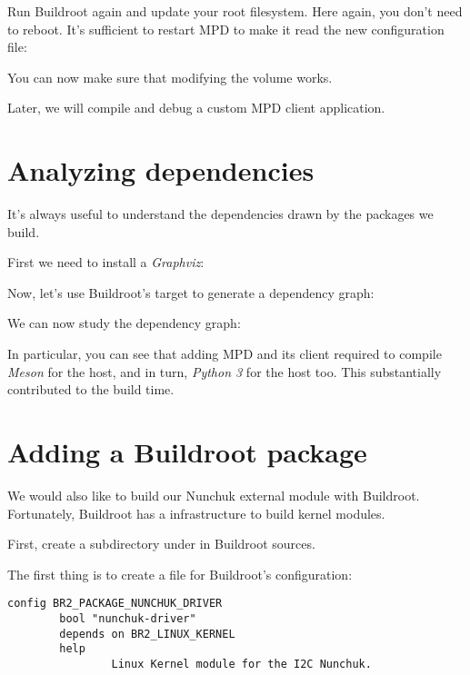 Run Buildroot again and update your root filesystem. Here again, you
don't need to reboot. It's sufficient to restart MPD to make it read
the new configuration file:


You can now make sure that modifying the volume works.

Later, we will compile and debug a custom MPD client application.

\section{Analyzing dependencies}

It's always useful to understand the dependencies drawn by the
packages we build.

First we need to install a {\em Graphviz}:


Now, let's use Buildroot's target to generate a
dependency graph:


We can now study the dependency graph:


In particular, you can see that adding MPD and its client
required to compile {\em Meson} for the host, and in turn,
{\em Python 3} for the host too. This substantially contributed to the
build time.

\section{Adding a Buildroot package}

We would also like to build our Nunchuk external module with Buildroot.
Fortunately, Buildroot has a  infrastructure
to build kernel modules.

First, create a  subdirectory under 
in Buildroot sources.

The first thing is to create a  file
for Buildroot's configuration:

\begin{verbatim}
config BR2_PACKAGE_NUNCHUK_DRIVER
        bool "nunchuk-driver"
        depends on BR2_LINUX_KERNEL
        help
                Linux Kernel module for the I2C Nunchuk.
\end{verbatim}

